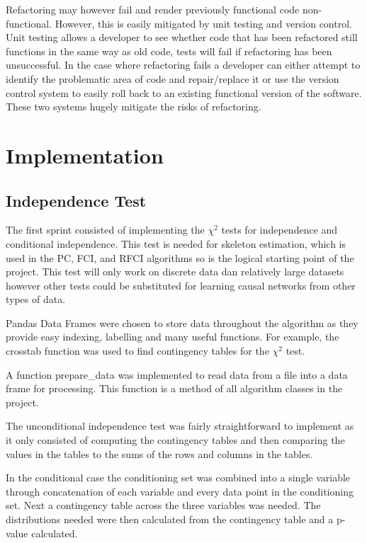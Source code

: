 \documentclass{UoYCSproject}
\begin{document}
Refactoring may however fail and render previously functional code non-functional. However, this is easily mitigated by unit testing and version control. Unit testing allows a developer to see whether code that has been refactored still functions in the same way as old code, tests will fail if refactoring has been unsuccessful. In the case where refactoring fails a developer can either attempt to identify the problematic area of code and repair/replace it or use the version control system to easily roll back to an existing functional version of the software. These two systems hugely mitigate the risks of refactoring.

\chapter{Implementation}

\section{Independence Test}
The first sprint consisted of implementing the  $\chi^2$ tests for independence and conditional independence. This test is needed for skeleton estimation, which is used in the PC, FCI, and RFCI algorithms so is the logical starting point of the project. This test will only work on discrete data dan relatively large datasets however other tests could be substituted for learning causal networks from other types of data.

Pandas Data Frames were chosen to store data throughout the algorithm as they provide easy indexing, labelling and many useful functions. For example, the crosstab function was used to find contingency tables for the $\chi^2$ test.

A function prepare\_data was implemented to read data from a file into a data frame for processing. This function is a method of all algorithm classes in the project.

The unconditional independence test was fairly straightforward to implement as it only consisted of computing the contingency tables and then comparing the values in the tables to the sums of the rows and columns in the tables.

In the conditional case the conditioning set was combined into a single variable through concatenation of each variable and every data point in the conditioning set. Next a contingency table across the three variables was needed. The distributions needed were then calculated from the contingency table and a p-value calculated.
\end{document}
